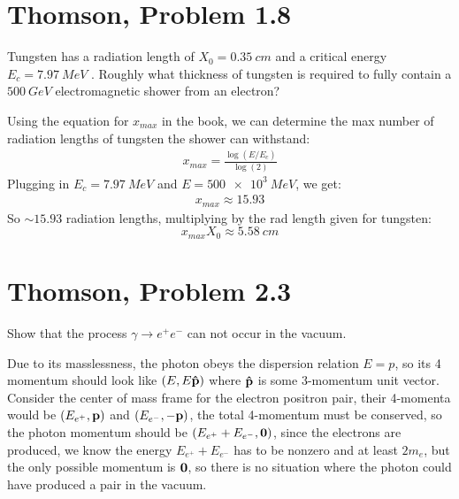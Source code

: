 \documentclass[12pt]{article}
\begin{document}
\section{Thomson, Problem 1.8}
\begin{problem}
  Tungsten has a radiation length of $X_0=\SI{0.35}{cm}$ and a critical energy $E_c=\SI{7.97}{MeV}$ . Roughly what thickness of tungsten is required to fully contain a $\SI{500}{GeV}$ electromagnetic shower from an electron?
\end{problem}
Using the equation for $x_{max}$ in the book, we can determine the max number of radiation lengths of tungsten the shower can withstand:
\begin{align*}
  x_{max}=\frac{\log(E/E_c)}{\log(2)}
\end{align*}
Plugging in $E_c=\SI{7.97}{MeV}$ and $E=\SI{500e3}{MeV}$, we get:
\begin{align*}
  x_{max}\approx15.93
\end{align*}
So $\sim15.93$ radiation lengths, multiplying by the rad length given for tungsten:
\begin{equation}
  \label{eq:p4}
  \boxed{x_{max}X_0\approx\SI{5.58}{cm}}
\end{equation}

\section{Thomson, Problem 2.3}
\begin{problem}
  Show that the process $\gamma\to e^+e^-$ can not occur in the vacuum.
\end{problem}
Due to its masslessness, the photon obeys the dispersion relation $E=p$, so its 4 momentum should look like $(E,E\vu{p})$ where $\vu{p}$ is some 3-momentum unit vector. Consider the center of mass frame for the electron positron pair, their 4-momenta would be $(E_{e^+},\vb{p})$ and $(E_{e^-},-\vb{p})$, the total 4-momentum must be conserved, so the photon momentum should be $(E_{e^+}+E_{e^-},\vb{0})$, since the electrons are produced, we know the energy $E_{e^+}+E_{e^-}$ has to be nonzero and at least $2m_e$, but the only possible momentum is $\vb{0}$, so there is no situation where the photon could have produced a pair in the vacuum.
\end{document}
